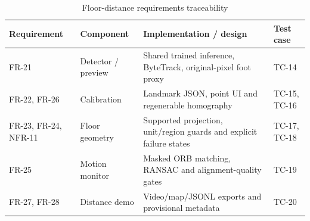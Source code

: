 \begin{longtable}{P{0.16\textwidth}P{0.22\textwidth}P{0.32\textwidth}P{0.16\textwidth}}
\caption{Floor-distance requirements traceability}\label{tab:floor-traceability}\\
\toprule
Requirement & Component & Implementation / design & Test case\\
\midrule
\endhead
FR-21 & Detector / preview & Shared trained inference, ByteTrack, original-pixel foot proxy & TC-14\\
FR-22, FR-26 & Calibration & Landmark JSON, point UI and regenerable homography & TC-15, TC-16\\
FR-23, FR-24, NFR-11 & Floor geometry & Supported projection, unit/region guards and explicit failure states & TC-17, TC-18\\
FR-25 & Motion monitor & Masked ORB matching, RANSAC and alignment-quality gates & TC-19\\
FR-27, FR-28 & Distance demo & Video/map/JSONL exports and provisional metadata & TC-20\\
\bottomrule
\end{longtable}
